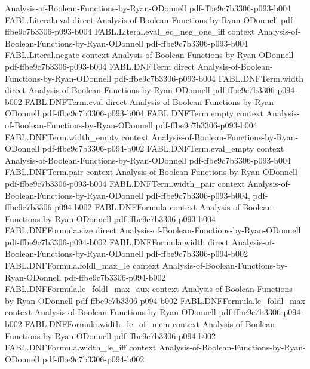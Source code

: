\begin{theorem}
  {Analysis-of-Boolean-Functions-by-Ryan-ODonnell}
  {pdf-ffbe9c7b3306-p093-b004}
\proofstep
  {FABL.Literal.eval}
  {direct}
  {Analysis-of-Boolean-Functions-by-Ryan-ODonnell}
  {pdf-ffbe9c7b3306-p093-b004}
\proofstep
  {FABL.Literal.eval_eq_neg_one_iff}
  {context}
  {Analysis-of-Boolean-Functions-by-Ryan-ODonnell}
  {pdf-ffbe9c7b3306-p093-b004}
\proofstep
  {FABL.Literal.negate}
  {context}
  {Analysis-of-Boolean-Functions-by-Ryan-ODonnell}
  {pdf-ffbe9c7b3306-p093-b004}
\proofstep
  {FABL.DNFTerm}
  {direct}
  {Analysis-of-Boolean-Functions-by-Ryan-ODonnell}
  {pdf-ffbe9c7b3306-p093-b004}
\proofstep
  {FABL.DNFTerm.width}
  {direct}
  {Analysis-of-Boolean-Functions-by-Ryan-ODonnell}
  {pdf-ffbe9c7b3306-p094-b002}
\proofstep
  {FABL.DNFTerm.eval}
  {direct}
  {Analysis-of-Boolean-Functions-by-Ryan-ODonnell}
  {pdf-ffbe9c7b3306-p093-b004}
\proofstep
  {FABL.DNFTerm.empty}
  {context}
  {Analysis-of-Boolean-Functions-by-Ryan-ODonnell}
  {pdf-ffbe9c7b3306-p093-b004}
\proofstep
  {FABL.DNFTerm.width_empty}
  {context}
  {Analysis-of-Boolean-Functions-by-Ryan-ODonnell}
  {pdf-ffbe9c7b3306-p094-b002}
\proofstep
  {FABL.DNFTerm.eval_empty}
  {context}
  {Analysis-of-Boolean-Functions-by-Ryan-ODonnell}
  {pdf-ffbe9c7b3306-p093-b004}
\proofstep
  {FABL.DNFTerm.pair}
  {context}
  {Analysis-of-Boolean-Functions-by-Ryan-ODonnell}
  {pdf-ffbe9c7b3306-p093-b004}
\proofstep
  {FABL.DNFTerm.width_pair}
  {context}
  {Analysis-of-Boolean-Functions-by-Ryan-ODonnell}
  {pdf-ffbe9c7b3306-p093-b004,
    pdf-ffbe9c7b3306-p094-b002}
\proofstep
  {FABL.DNFFormula}
  {context}
  {Analysis-of-Boolean-Functions-by-Ryan-ODonnell}
  {pdf-ffbe9c7b3306-p093-b004}
\proofstep
  {FABL.DNFFormula.size}
  {direct}
  {Analysis-of-Boolean-Functions-by-Ryan-ODonnell}
  {pdf-ffbe9c7b3306-p094-b002}
\proofstep
  {FABL.DNFFormula.width}
  {direct}
  {Analysis-of-Boolean-Functions-by-Ryan-ODonnell}
  {pdf-ffbe9c7b3306-p094-b002}
\proofstep
  {FABL.DNFFormula.foldl_max_le}
  {context}
  {Analysis-of-Boolean-Functions-by-Ryan-ODonnell}
  {pdf-ffbe9c7b3306-p094-b002}
\proofstep
  {FABL.DNFFormula.le_foldl_max_aux}
  {context}
  {Analysis-of-Boolean-Functions-by-Ryan-ODonnell}
  {pdf-ffbe9c7b3306-p094-b002}
\proofstep
  {FABL.DNFFormula.le_foldl_max}
  {context}
  {Analysis-of-Boolean-Functions-by-Ryan-ODonnell}
  {pdf-ffbe9c7b3306-p094-b002}
\proofstep
  {FABL.DNFFormula.width_le_of_mem}
  {context}
  {Analysis-of-Boolean-Functions-by-Ryan-ODonnell}
  {pdf-ffbe9c7b3306-p094-b002}
\proofstep
  {FABL.DNFFormula.width_le_iff}
  {context}
  {Analysis-of-Boolean-Functions-by-Ryan-ODonnell}
  {pdf-ffbe9c7b3306-p094-b002}

\end{theorem}
